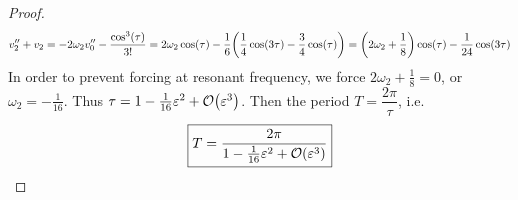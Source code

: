 \documentclass{article} %
\theoremstyle{plain}
\newcommand{\E}{\varepsilon}
\numberwithin{equation}{section} %
\numberwithin{figure}{section} %
\numberwithin{table}{section} %
\begin{document}
\begin{proof}
    \begin{align*}
        v_2'' + v_2 = -2\omega_2v_0'' - \frac{\cos^3(\tau)}{3!} = 2\omega_2\cos(\tau) - \frac{1}{6}\qty(\frac{1}{4}\cos(3\tau) - \frac{3}{4}\cos(\tau)) = \qty(2\omega_2 + \frac{1}{8})\cos(\tau) - \frac{1}{24}\cos(3\tau)
    \end{align*}
    In order to prevent forcing at resonant frequency, we force $2\omega_2 + \frac{1}{8} = 0$, or $\omega_2 = -\frac{1}{16}$.  Thus $\tau = 1 - \frac{1}{16}\E^2 + \order{\E^3}$.  Then the period $T = \dfrac{2\pi}{\tau}$, i.e.
    \begin{align*}
        \boxed{T = \frac{2\pi}{1 - \frac{1}{16}\E^2 + \order{\E^3}}}
    \end{align*}
\end{proof}
    
\end{document}
